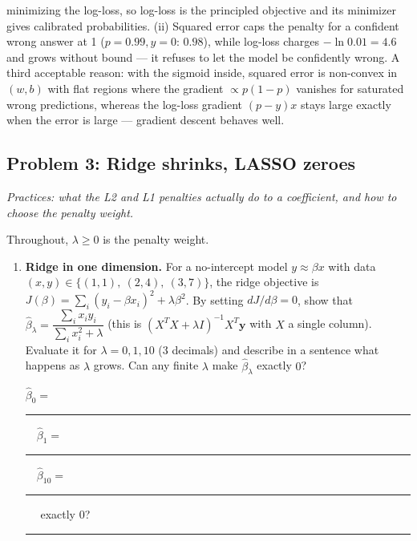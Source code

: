 \documentclass[
  11pt,
]{article}
\newcommand{\answerspace}[1]{\par\vspace*{#1}}  %
\newcommand{\blank}[1][1.2in]{\rule{#1}{0.4pt}}
\newcommand{\answerpage}{\clearpage}
\begin{document}
\begin{solutionbox}
\begin{enumerate}
\begin{enumerate}
    minimizing the log-loss, so log-loss is the principled objective and
    its minimizer gives calibrated probabilities. (ii) Squared error
    caps the penalty for a confident wrong answer at 1 (\(p=0.99, y=0\):
    \(0.98\)), while log-loss charges \(-\ln 0.01 = 4.6\) and grows
    without bound --- it refuses to let the model be confidently wrong.
    A third acceptable reason: with the sigmoid inside, squared error is
    non-convex in \((w,b)\) with flat regions where the gradient
    \(\propto p(1-p)\) vanishes for saturated wrong predictions, whereas
    the log-loss gradient \((p-y)x\) stays large exactly when the error
    is large --- gradient descent behaves well.
  \end{enumerate}
\end{enumerate}

\end{solutionbox}

\answerpage

\subsection{Problem 3: Ridge shrinks, LASSO
zeroes}\label{problem-3-ridge-shrinks-lasso-zeroes}

\emph{Practices: what the L2 and L1 penalties actually do to a
coefficient, and how to choose the penalty weight.}

Throughout, \(\lambda \ge 0\) is the penalty weight.

\begin{enumerate}
\def\labelenumi{(\alph{enumi})}
\item
  \textbf{Ridge in one dimension.} For a no-intercept model
  \(y \approx \beta x\) with data
  \((x, y) \in \{(1,1),\ (2,4),\ (3,7)\}\), the ridge objective is
  \(J(\beta) = \sum_i (y_i - \beta x_i)^2 + \lambda\beta^2\). By setting
  \(dJ/d\beta = 0\), show that
  \(\hat\beta_\lambda = \dfrac{\sum_i x_iy_i}{\sum_i x_i^2 + \lambda}\)
  (this is \((X^TX + \lambda I)^{-1}X^T\mathbf y\) with \(X\) a single
  column). Evaluate it for \(\lambda = 0, 1, 10\) (3 decimals) and
  describe in a sentence what happens as \(\lambda\) grows. Can any
  finite \(\lambda\) make \(\hat\beta_\lambda\) exactly \(0\)?

  \(\hat\beta_0 =\) \blank[0.8in] \(\quad \hat\beta_1 =\)
  \blank[0.8in] \(\quad \hat\beta_{10} =\) \blank[0.8in] \(\quad\)
  exactly \(0\)? \blank[0.6in]
\end{enumerate}

\answerspace{2.5in}
\newpage
\end{document}
